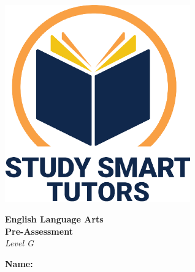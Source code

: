 \documentclass[12pt]{article}
\title{}
\date{}
\newcommand{\levelLetter}{G}
\newcommand{\assessmenttype}{Pre-Assessment}
\begin{document}
\thispagestyle{empty}

\vspace*{\fill}

\vspace*{3cm}

\begin{center}

    \includegraphics[width=0.6\textwidth]{SST_Color_Logo.png} %
    
    \vspace{1cm} %
    
    
    \Huge \textbf{English Language Arts \\ \assessmenttype }\\ 
     \vspace{1 cm}
      \LARGE \textit{Level \levelLetter}\\[1cm]
 \vspace{0.5cm}
    
   


    \LARGE \textbf{Name:} \underline{\hspace{8cm}}

    
    \vfill %
    
\end{center}


\newpage
\thispagestyle{empty}
\vspace*{\fill}
\newpage


\newpage


\end{document}
